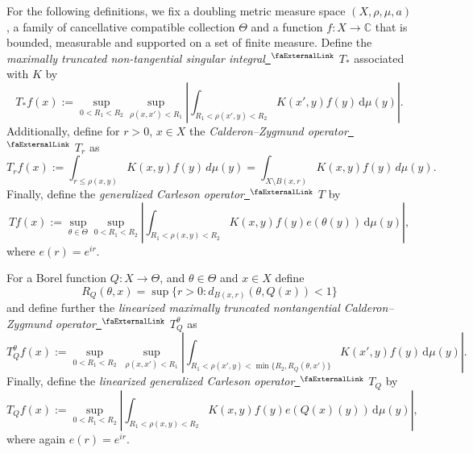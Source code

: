\documentclass[12pt, reqno]{amsart}
\newcommand*{\complex}{\mathbb{C}} %
\newcommand{\extlink}{~\ensuremath{{}^\text{\faExternalLink}}}
\theoremstyle{definition}
\theoremstyle{plain}
\newcommand{\tQ}{{Q}}
\newcommand{\mfa}{{\theta}}
\newcommand{\Mf}{{\Theta}}
\begin{document}
For the following definitions, we fix a doubling metric measure space $(X, \rho, \mu, a)$, a family of cancellative compatible collection $\Mf$ and a
function $f\colon X \to \complex$ that is bounded, measurable and supported on a set of finite measure.
Define the \emph{maximally truncated non-tangential singular integral}\href{https://github.com/fpvandoorn/carleson/blob/AFM-frozen/Carleson/Defs.lean#L211-L212}{\extlink} $T_{*}$ associated with $K$ by
\begin{equation}
    \label{def-tang-unm-op}
    T_{*}f(x):=\sup_{0 < R_1 < R_2} \sup_{\rho(x,x')<R_1} \left|\int_{R_1< \rho(x',y) < R_2} K(x',y) f(y) \, \mathrm{d}\mu(y) \right|.
\end{equation}
Additionally, define for $r > 0$, $x\in X$ the \emph{Calderon--Zygmund operator}\href{https://github.com/fpvandoorn/carleson/blob/AFM-frozen/Carleson/TwoSidedCarleson/Basic.lean#L15-L16}{\extlink} $T_r$ as
\begin{equation}
\label{def-T-r}
T_r f(x):= \int_{r\le\rho(x,y)} K(x,y) f(y) \, d\mu(y) = \int_{X\setminus B(x,r)} K(x,y) f(y) \, d\mu(y).
\end{equation}
Finally, define the \emph{generalized Carleson operator}\href{https://github.com/fpvandoorn/carleson/blob/AFM-frozen/Carleson/Defs.lean#L228-L229}{\extlink} $T$ by
\begin{equation}
    \label{def-main-op}
    Tf(x):=\sup_{\mfa\in\Mf} \sup_{0 < R_1 < R_2}\left| \int_{R_1 < \rho(x,y) < R_2} K(x,y) f(y) e(\mfa(y)) \, \mathrm{d}\mu(y) \right|,
\end{equation}
where $e(r)=e^{ir}$.

For a Borel function $\tQ:X\to \Mf$, and $\mfa \in \Mf$ and $x\in X$ define
\begin{equation*}
    R_{\tQ}(\mfa,x)=\sup\{r>0:d_{B(x,r)}(\mfa, \tQ(x))<1\}
\end{equation*}
and define further the \emph{linearized maximally truncated nontangential Calderon–Zygmund operator}\href{https://github.com/fpvandoorn/carleson/blob/38587d19c6c4c38a179b68476f717cad2706c51e/Carleson/Defs.lean#L204-L208}{\extlink} $T_{\tQ}^\mfa$ as
\begin{equation}\label{def-lin-star-op}
    T_{\tQ}^\mfa f(x):=\sup_{0<R_1<R_2} \ \sup_{\rho(x,x')<R_1}
    \left|\int_{R_1< \rho(x',y) < \min\{R_2, R_{\tQ}(\mfa,x')\}} K(x',y) f(y) \, \mathrm{d}\mu(y) \right|.
\end{equation}
Finally, define the \emph{linearized generalized Carleson operator}\href{https://github.com/fpvandoorn/carleson/blob/38587d19c6c4c38a179b68476f717cad2706c51e/Carleson/Defs.lean#L222-L224}{\extlink} $T_\tQ$ by
\begin{equation}\label{def-lin-main-op}
    T_\tQ f(x):= \sup_{0 < R_1 < R_2}\left| \int_{R_1 < \rho(x,y) < R_2} K(x,y) f(y) e(\tQ(x)(y)) \, \mathrm{d}\mu(y) \right|,
\end{equation}
where again $e(r)=e^{ir}$.
\end{document}
